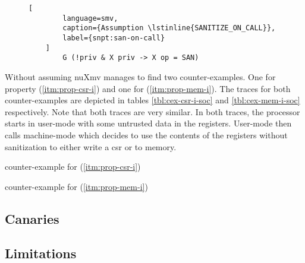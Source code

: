 \begin{figure}
    \begin{lstlisting}[
        language=smv,
        caption={Assumption \lstinline{SANITIZE_ON_CALL}},
        label={snpt:san-on-call}
    ]
        G (!priv & X priv -> X op = SAN)
    \end{lstlisting}
\end{figure}

Without assuming  nuXmv manages to find two counter-examples.
One for property  (\ref{itm:prop-csr-i}) and one for  (\ref{itm:prop-mem-i}).
The traces for both counter-examples are depicted in tables \ref{tbl:cex-csr-i-soc} and \ref{tbl:cex-mem-i-soc} respectively.
Note that both traces are very similar.
In both traces, the processor starts in user-mode with some untrusted data in the registers.
User-mode then calls machine-mode which decides to use the contents of the registers without sanitization to either write a \gls{csr} or to memory.

\begin{table}
    \centering
    
    \caption{ counter-example for  (\ref{itm:prop-csr-i})}
    \label{tbl:cex-csr-i-soc}
\end{table}

\begin{table}
    \centering
    
    \caption{ counter-example for  (\ref{itm:prop-mem-i})}
    \label{tbl:cex-mem-i-soc}
\end{table}

\subsection{Canaries}
\label{sec:canaries}

\subsection{Limitations}
